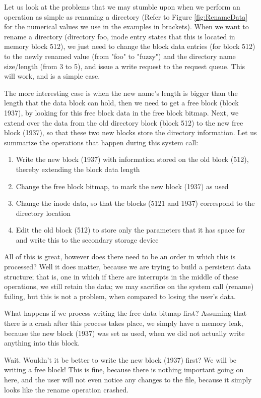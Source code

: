 \documentclass[a4paper]{article}
\begin{document}
Let us look at the problems that we may stumble upon when we perform an operation as simple as renaming a directory (Refer to Figure \ref{fig:RenameData} for the numerical values we use in the examples in brackets). When we want to rename a directory (directory foo, inode entry states that this is located in memory block 512), we just need to change the block data entries (for block 512) to the newly renamed value (from "foo" to "fuzzy") and the directory name size/length (from 3 to 5), and issue a write request to the request queue. This will work, and is a simple case.

The more interesting case is when the new name's length is bigger than the length that the data block can hold, then we need to get a free block (block 1937), by looking for this free block data in the free block bitmap. Next, we extend over the data from the old directory block (block 512) to the new free block (1937), so that these two new blocks store the directory information. Let us summarize the operations that happen during this system call:

\begin{enumerate}
\item Write the new block (1937) with information stored on the old block (512), thereby extending the block data length
\item Change the free block bitmap, to mark the new block (1937) as used
\item Change the inode data, so that the blocks (5121 and 1937) correspond to the directory location 
\item Edit the old block (512) to store only the parameters that it has space for and write this to the secondary storage device
\end{enumerate}

All of this is great, however does there need to be an order in which this is processed? Well it does matter, because we are trying to build a persistent data structure; that is, one in which if there are interrupts in the middle of these operations, we still retain the data; we may sacrifice on the system call (rename) failing, but this is not a problem, when compared to losing the user's data. 

What happens if we process writing the free data bitmap first? Assuming that there is a crash after this process takes place, we simply have a memory leak, because the new block (1937) was set as used, when we did not actually write anything into this block. 

Wait. Wouldn't it be better to write the new block (1937) first? We will be writing a free block! This is fine, because there is nothing important going on here, and the user will not even notice any changes to the file, because it simply looks like the rename operation crashed. 
\end{document}
